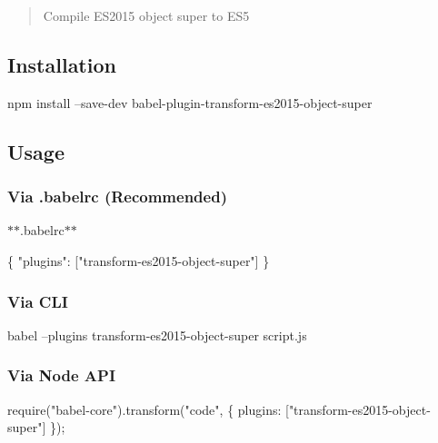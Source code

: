 \begin{quote}
Compile E\+S2015 object super to E\+S5 \end{quote}


\subsection*{Installation}


\begin{DoxyCode}
npm install --save-dev babel-plugin-transform-es2015-object-super
\end{DoxyCode}


\subsection*{Usage}

\subsubsection*{Via {\ttfamily .babelrc} (Recommended)}

$\ast$$\ast$.babelrc$\ast$$\ast$


\begin{DoxyCode}
\{
  "plugins": ["transform-es2015-object-super"]
\}
\end{DoxyCode}


\subsubsection*{Via C\+LI}


\begin{DoxyCode}
babel --plugins transform-es2015-object-super script.js
\end{DoxyCode}


\subsubsection*{Via Node A\+PI}


\begin{DoxyCode}
require("babel-core").transform("code", \{
  plugins: ["transform-es2015-object-super"]
\});
\end{DoxyCode}
 
